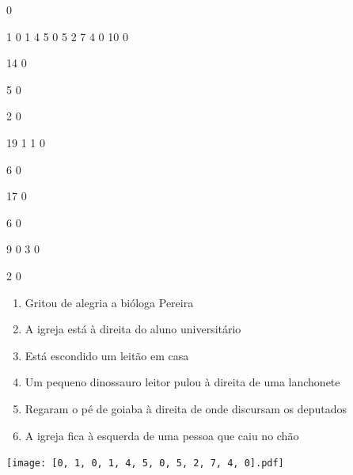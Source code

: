 \documentclass[12pt]{article}
\begin{document}
		\vfill  
		  
{
	0	%

	1	%
	0	%
	1	%
	4	%
	5	%
	0	%
	5	%
	2	%
	7	%
	4	%
	0	%
	10	%
	0	%

	14	%
	0	%

	5	%
	0	%

	2	%
	0	%

	19	%
	1	%
	1	%
	0	%

	6	%
	0	%

	17	%
	0	%

	6	%
	0	%

	9	%
	0	%
	3	%
	0	%

	2	%
	0	%

}	  
		    	

		 

\pagebreak


	\begin{enumerate}
		  \sffamily %
		  \large %


\vfill \item
Gritou de alegria	%
a bióloga Pereira	%

\vfill \item
A igreja está	%
à direita
do aluno universitário	%

\vfill \item
Está escondido um leitão	%
em casa	%

\vfill \item
Um pequeno dinossauro leitor pulou	%
à direita
de uma lanchonete	%

\vfill \item
Regaram o pé de goiaba	%
à direita
de onde discursam os deputados	%

\vfill \item
A igreja fica	%
à esquerda
de uma pessoa que caiu no chão	%
	\end{enumerate}
		  
		  \hfill

		  \vfill

\texttt{[image: [0, 1, 0, 1, 4, 5, 0, 5, 2, 7, 4, 0].pdf]}


	\hfill	  	  

\end{document}
